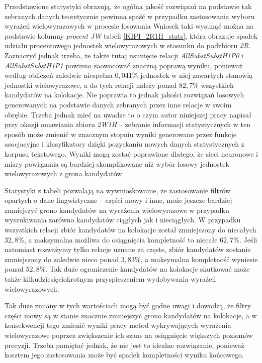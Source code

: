 \par
Przedstawione statystyki obrazują, że ogólna jakość rozwiązań na podstawie tak zebranych danych teoretycznie powinna spaść w przypadku zastosowania wyboru wyrażeń wielowyrazowych w procesie losowania
Wniosek taki wysunąć można na podstawie kolumny \emph{procent JW} tabeli \ref{KIPI_2R1H_stats}, która obrazuje spadek udziału procentowego jednostek wielowyrazowych w stosunku do podzbioru \emph{2R}.
Zaznaczyć jednak trzeba, że także tutaj usunięcie relacji \emph{AllSubstSubstH1P0} i \emph{AllSubstSubstH1P1} powinno zaowocować znaczną poprawą wyniku, ponieważ według obliczeń zaledwie niespełna $ 0,041\% $ jednostek w niej zawartych stanowią jednostki wielowyrazowe, a do tych relacji należy ponad $ 82,7\% $ wszystkich kandydatów na kolokacje.
Nie poprawia to jednak jakości rozwiązań losowych generowanych na podstawie danych zebranych przez inne relacje w swoim obrębie.
Trzeba jednak mieć na uwadze to o czym autor niniejszej pracy napisał przy okazji omawiania zbioru \emph{2W1H} -- zebranie informacji statystycznych w ten sposób może zmienić w znacznym stopniu wyniki generowane przez funkcje asocjacyjne i klasyfikatory dzięki pozyskaniu nowych danych statystycznych z korpusu tekstowego.
Wyniki mogą zostać poprawione dlatego, że sieci neuronowe i miary powiązania są bardziej skomplikowane niż wybór losowy jednostek wielowyrazowych z grona kandydatów.

\par
Statystyki z tabeli pozwalają na wywnioskowanie, że zastosowanie filtrów opartych o dane lingwistyczne -- części mowy i inne, może jeszcze bardziej zmniejszyć grono kandydatów na wyrażenia wielowyrazowe w przypadku wyszukiwania zarówno kandydatów ciągłych jak i nieciągłych.
W przypadku wszystkich relacji zbiór kandydatów na kolokacje został zmniejszony do niecałych $ 32,8\% $, a maksymalna możliwa do osiągnięcia kompletność to niecałe $ 62,7\% $.
Jeśli natomiast rozważymy tylko relacje uznane za częste, zbiór kandydatów zostanie zmniejszony do zaledwie nieco ponad $ 3,83\% $, a maksymalna kompletność wyniesie ponad $ 52,8\% $.
Tak duże ograniczenie kandydatów na kolokacje skutkować może także kilkudziesięciokrotnym przyspieszeniem wydobywania wyrażeń wielowyrazowych.

\par
Tak duże zmiany w tych wartościach mogą być godne uwagi i dowodzą, że filtry części mowy są w stanie znacznie zmniejszyć grono kandydatów na kolokacje, a w konsekwencji tego zmienić wyniki pracy metod wykrywających wyrażenia wielowyrazowe poprzez zwiększenie ich szans na osiągnięcie większych poziomów precyzji.
Trzeba pamiętać jednak, że nie jest to idealne rozwiązanie, ponieważ kosztem jego zastosowania może być spadek kompletności wyniku końcowego.


